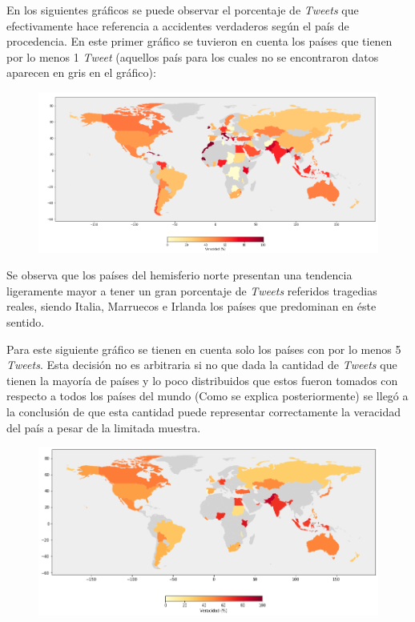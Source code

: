 \documentclass[titlepage,a4paper]{article}
\begin{document}
    En los siguientes gráficos se puede observar el porcentaje de \textit{Tweets} que efectivamente hace referencia a accidentes verdaderos según el país de procedencia. En este primer gráfico se tuvieron en cuenta los países que tienen por lo menos 1 \textit{Tweet} (aquellos país para los cuales no se encontraron datos aparecen en gris en el gráfico):
    
    \begin{figure}[H]
    \raggedleft
    \includegraphics[width=1\textwidth]{graficos/Analisis de Locacion/map1.png}
    \caption{}
    \end{figure}
    
    Se observa que los países del hemisferio norte presentan una tendencia ligeramente mayor a tener un gran porcentaje de \textit{Tweets} referidos tragedias reales, siendo Italia, Marruecos e Irlanda los países que predominan en éste sentido.

    Para este siguiente gráfico se tienen en cuenta solo los países con por lo menos 5 \textit{Tweets}. Esta decisión no es arbitraria si no que dada la cantidad de \textit{Tweets} que tienen la mayoría de países y lo poco distribuidos que estos fueron tomados con respecto a todos los países del mundo (Como se explica posteriormente) se llegó a la conclusión de que esta cantidad puede representar correctamente la veracidad del país a pesar de la limitada muestra.
    
    \begin{figure}[H]
    \raggedleft
    \includegraphics[width=1.1\textwidth]{graficos/Analisis de Locacion/map2.png}
    \caption{}
    \end{figure}  
    
\end{document}
